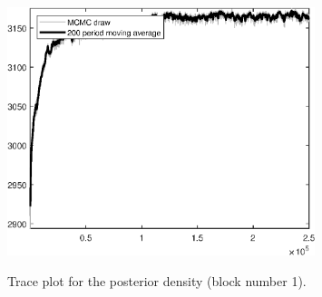 \begin{figure}[H]
\centering
  \includegraphics[width=0.8\textwidth]{BRS_aggregate/graphs/TracePlot_Posterior_blck_1}\\
    \caption{Trace plot for the posterior density (block number 1).}
\end{figure}
